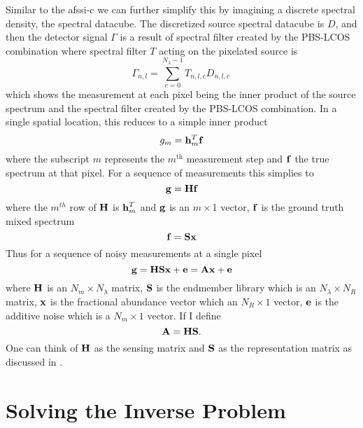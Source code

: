 Similar to the \gls{afssi-c} we can further simplify this by imagining a discrete spectral density, the spectral datacube. The discretized source spectral datacube is $D$, and then the detector signal $\Gamma$ is a result of spectral filter created by the PBS-LCOS combination where spectral filter $T$ acting on the pixelated source is
%
%
\begin{equation}
	\Gamma_{n,l} = \sum^{N_{\lambda}-1}_{c = 0} T_{n,l,c} D_{n,l,c} \,
\end{equation}
%
%
which shows the measurement at each pixel being the inner product of the source spectrum and the spectral filter created by the PBS-LCOS combination. In a single spatial location, this reduces to a simple inner product
%
\begin{equation}
	g_m = \displaystyle \mathbf{h}_m^{T} \displaystyle \mathbf{f} 
\end{equation}
%
where the subscript $m$ represents the $m^{\text{th}}$ measurement step and $\displaystyle \mathbf{f}$ the true spectrum at that pixel. For a sequence of measurements this simplies to 
%
\begin{equation}
	\displaystyle \mathbf{g} = \displaystyle \mathbf{H} \displaystyle \mathbf{f}
\end{equation}
%
where the $m^{th}$ row of $\displaystyle \mathbf{H}$ is $\displaystyle \mathbf{h}_m^T$ and $\displaystyle \mathbf{g}$ is an $m \times$1 vector, $\displaystyle \mathbf{f}$ is the ground truth mixed spectrum
%
\begin{equation}
	\displaystyle \mathbf{f} = \displaystyle \mathbf{S}\displaystyle \mathbf{x}
\end{equation}
%
Thus for a sequence of noisy measurements at a single pixel
%
\begin{equation}
	\displaystyle \mathbf{g} = \displaystyle \mathbf{H}\displaystyle \mathbf{S}\displaystyle \mathbf{x} + \displaystyle \mathbf{e} = \displaystyle \mathbf{A}\displaystyle \mathbf{x} + \displaystyle \mathbf{e}
\end{equation}\label{eq:csuForwardModel}
%
where $\displaystyle \mathbf{H}$ is an $N_m \times N_{\lambda}$ matrix, $\displaystyle \mathbf{S}$ is the endmember library which is an $N_{\lambda} \times N_{R}$ matrix, $\displaystyle \mathbf{x}$ is the fractional abundance vector which an $N_R \times 1$ vector, $\displaystyle \mathbf{e}$ is the additive noise which is a $N_m \times 1$ vector. If I define
%
\begin{equation}
	\displaystyle \mathbf{A} = \displaystyle \mathbf{H} \displaystyle \mathbf{S}.
\end{equation}
%
One can think of $\displaystyle \mathbf{H}$ as the sensing matrix and $\displaystyle \mathbf{S}$ as the representation matrix as discussed in .


\section{Solving the Inverse Problem}


